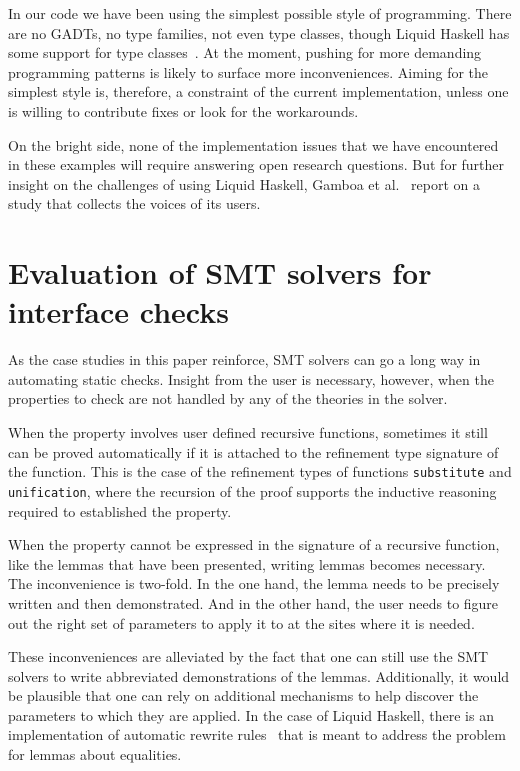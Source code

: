 \documentclass[sigconf, anonymous, review]{acmart}
\newcommand{\tc}[1]{{\small\texttt{#1}}}
\begin{document}
In our code we have been using the simplest possible style of programming.
There are no GADTs, no type families, not even type classes, though
Liquid Haskell has some support for type classes~\cite{liu20}. At the moment,
pushing for more demanding programming patterns is likely to surface more
inconveniences. Aiming for the simplest style is, therefore, a constraint of
the current implementation, unless one is willing to contribute fixes or
look for the workarounds.

On the bright
side, none of the implementation issues that we have encountered in these
examples will require answering open research questions.
But for further insight on the challenges of using Liquid Haskell,
Gamboa et al.~\cite{gamboa25} report on a study that collects the voices
of its users.

\section{Evaluation of SMT solvers for interface checks}
\label{SMT-solvers-for-interface-checks}

As the case studies in this paper reinforce, SMT solvers can go a long way in
automating static checks. Insight from the user is necessary, however,
when the properties to check are not handled by any of the theories in the
solver.

When the property involves user defined recursive functions,
sometimes it still can be proved automatically if it is attached to the
refinement type signature of the function. This is the case of the refinement
types of functions \tc{substitute} and \tc{unification}, where the recursion
of the proof supports the inductive reasoning required to established the
property.

When the property cannot be expressed in the signature of a recursive function,
like the lemmas that have been presented, writing lemmas becomes necessary. The
inconvenience is two-fold. In the one hand, the lemma needs to be precisely
written and then demonstrated. And in the other hand, the user needs to figure
out the right set of parameters to apply it to at the sites where it is needed.

These inconveniences are alleviated by the fact that one can still use the
SMT solvers to write abbreviated demonstrations of the lemmas. Additionally,
it would be plausible that one can rely on additional mechanisms to help
discover the parameters to which they are applied. In the case of Liquid
Haskell, there is an implementation of automatic rewrite rules~\cite{grannan22}
that is meant to address the problem for lemmas about equalities.
\end{document}
